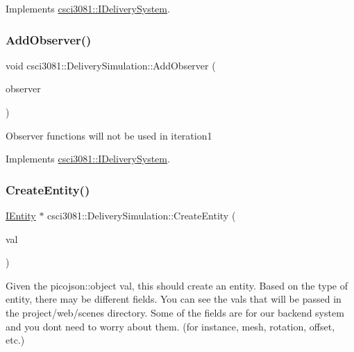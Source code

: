 Implements \hyperlink{classcsci3081_1_1IDeliverySystem_a4d6a5fa94ab597dbe88ae0046d698e76}{csci3081\+::\+I\+Delivery\+System}.

\mbox{\label{classcsci3081_1_1DeliverySimulation_a58859737b937fa7724e7eb0157dced2f}} 
\subsubsection{\texorpdfstring{Add\+Observer()}{AddObserver()}}
{\footnotesize\ttfamily void csci3081\+::\+Delivery\+Simulation\+::\+Add\+Observer (\begin{DoxyParamCaption}\item[{\hyperlink{classentity__project_1_1IEntityObserver}{I\+Entity\+Observer} $\ast$}]{observer }\end{DoxyParamCaption})\hspace{0.3cm}{\ttfamily [virtual]}}

Observer functions will not be used in iteration1 

Implements \hyperlink{classcsci3081_1_1IDeliverySystem_a53161d8f9f94ee5f56e39f98b52ac3e2}{csci3081\+::\+I\+Delivery\+System}.

\mbox{\label{classcsci3081_1_1DeliverySimulation_a2441732ada38ae3b816266c9d471e528}} 
\subsubsection{\texorpdfstring{Create\+Entity()}{CreateEntity()}}
{\footnotesize\ttfamily \hyperlink{classentity__project_1_1IEntity}{I\+Entity} $\ast$ csci3081\+::\+Delivery\+Simulation\+::\+Create\+Entity (\begin{DoxyParamCaption}\item[{const picojson\+::object \&}]{val }\end{DoxyParamCaption})\hspace{0.3cm}{\ttfamily [virtual]}}

Given the picojson\+::object val, this should create an entity. Based on the type of entity, there may be different fields. You can see the vals that will be passed in the project/web/scenes directory. Some of the fields are for our backend system and you don\textquotesingle{}t need to worry about them. (for instance, mesh, rotation, offset, etc.)

